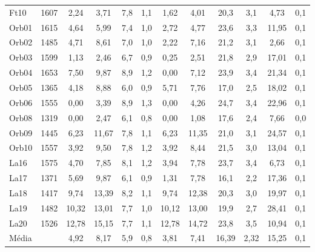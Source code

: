 \begin{landscape}
\begin{table}[H]
\begin{tabular}{ll|cccc|cccc|cc}
Ft10                       & 1607                   & 2,24    & 3,71   & 7,8   & 1,1   & 1,62    & 4,01    & 20,3  & 3,1   & 4,73        & 0,1      \\
Orb01                      & 1615                   & 4,64    & 5,99   & 7,4   & 1,0   & 2,72    & 4,77    & 23,6  & 3,3   & 11,95       & 0,1      \\
Orb02                      & 1485                   & 4,71    & 8,61   & 7,0   & 1,0   & 2,22    & 7,16    & 21,2  & 3,1   & 2,66        & 0,1      \\
Orb03                      & 1599                   & 1,13    & 2,46   & 6,7   & 0,9   & 0,25    & 2,51    & 21,8  & 2,9   & 17,01       & 0,1      \\
Orb04                      & 1653                   & 7,50    & 9,87   & 8,9   & 1,2   & 0,00    & 7,12    & 23,9  & 3,4   & 21,34       & 0,1      \\
Orb05                      & 1365                   & 4,18    & 8,88   & 6,0   & 0,9   & 5,71    & 7,76    & 17,0  & 2,5   & 18,02       & 0,1      \\
Orb06                      & 1555                   & 0,00    & 3,39   & 8,9   & 1,3   & 0,00    & 4,26    & 24,7  & 3,4   & 22,96       & 0,1      \\
Orb08                      & 1319                   & 0,00    & 2,47   & 6,1   & 0,8   & 0,00    & 1,08    & 17,6  & 2,4   & 7,66        & 0,0      \\
Orb09                      & 1445                   & 6,23    & 11,67  & 7,8   & 1,1   & 6,23    & 11,35   & 21,0  & 3,1   & 24,57       & 0,1      \\
Orb10                      & 1557                   & 3,92    & 9,50   & 7,8   & 1,2   & 3,92    & 8,44    & 21,5  & 3,0   & 13,04       & 0,1      \\
La16                       & 1575                   & 4,70    & 7,85   & 8,1   & 1,2   & 3,94    & 7,78    & 23,7  & 3,4   & 6,73        & 0,1      \\
La17                       & 1371                   & 5,69    & 9,87   & 6,1   & 0,9   & 1,31    & 7,78    & 16,1  & 2,2   & 17,36       & 0,1      \\
La18                       & 1417                   & 9,74    & 13,39  & 8,2   & 1,1   & 9,74    & 12,38   & 20,3  & 3,0   & 19,97       & 0,1      \\
La19                       & 1482                   & 10,32   & 13,01  & 7,7   & 1,0   & 10,12   & 13,00   & 19,9  & 2,7   & 28,41       & 0,1      \\
La20                       & 1526                   & 12,78   & 15,15  & 7,7   & 1,1   & 12,78   & 14,72   & 23,8  & 3,5   & 10,94       & 0,1      \\ \hline
Média                      &                        & 4,92    & 8,17   & 5,9   & 0,8   & 3,81    & 7,41    & 16,39 & 2,32  & 15,25       & 0,1      
\end{tabular}
\end{table}
\end{landscape}

